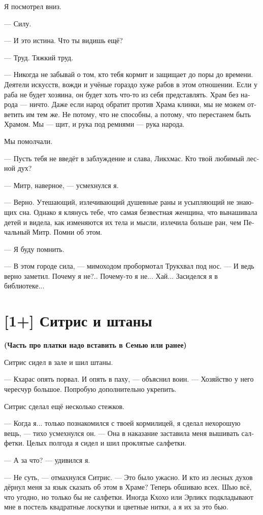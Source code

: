 \documentclass[a4paper,12pt,fleqn]{book}\usepackage{polyglossia}\setdefaultlanguage[babelshorthands=true]{russian}\setotherlanguage{english}\defaultfontfeatures{Ligatures=TeX,Mapping=tex-text}\usepackage{xcolor}\newcommand{\ml}[3]{#2}
\begin{document}
{Я посмотрел вниз.

--- Силу.

--- И это истина.
Что ты видишь ещё?

--- Труд.
Тяжкий труд.

--- Никогда не забывай о том, кто тебя кормит и защищает до поры до времени.
Деятели искусств, вожди и учёные гораздо хуже рабов в этом отношении.
Если у раба не будет хозяина, он будет хоть что-то из себя представлять.
Храм без народа --- ничто.
Даже если народ обратит против Храма клинки, мы не можем ответить им тем же.
Не потому, что не способны, а потому, что перестанем быть Храмом.
Мы --- щит, и рука под ремнями --- рука народа.

Мы помолчали.

--- Пусть тебя не введёт в заблуждение и слава, Ликхмас.
Кто твой любимый лесной дух?

--- Митр, наверное, --- усмехнулся я.

--- Верно.
Утешающий, излечивающий душевные раны и усыпляющий не знающих сна.
Однако я клянусь тебе, что самая безвестная женщина, что вынашивала детей и видела, как изменяются их тела и мысли, излечила больше ран, чем Печальный Митр.
Помни об этом.

--- Я буду помнить.

--- В этом городе сила, --- мимоходом пробормотал Трукхвал под нос.
--- И ведь верно заметил.
Почему я не?..
Почему-то я не...
Хай... Засиделся я в библиотеке...

\section{[1+] Ситрис и штаны}

\textbf{(Часть про платки надо вставить в Семью или ранее)}

Ситрис сидел в зале и шил штаны.

--- Кхарас опять порвал.
И опять в паху, --- объяснил воин.
--- Хозяйство у него чересчур большое.
Попробую дополнительно укрепить.

Ситрис сделал ещё несколько стежков.

--- Когда я... только познакомился с твоей кормилицей, я сделал нехорошую вещь, --- тихо усмехнулся он.
--- Она в наказание заставила меня вышивать салфетки.
Целых полгода я сидел и шил проклятые салфетки.

--- А за что? --- удивился я.

--- Не суть, --- отмахнулся Ситрис.
--- Это было ужасно.
И кто из лесных духов дёрнул меня за язык сказать об этом в Храме?
Теперь обшиваю всех.
Шью всё, что угодно, но только бы не салфетки.
Иногда Кхохо или Эрликх подкладывают мне в постель квадратные лоскутки и цветные нитки, а я их за это бью.

}
\end{document}
